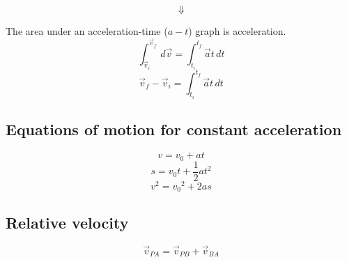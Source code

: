\documentclass[11pt]{article}
\begin{document}
\[\Downarrow\]

The area under an acceleration-time (\(a-t\)) graph is acceleration.
\[\int_{\vec{v}_i}^{\vec{v}_f} \, d \vec{v} = \int_{t_i}^{t_f} \vec{a} t \, dt\]
\[\vec{v}_f - \vec{v}_i = \int_{t_i}^{t_f} \vec{a} t \, dt\]
\subsection{Equations of motion for constant acceleration}
\label{sec:org6dbaeca}

\[v = v_0 + at \tag{1}\]
\[s = v_0t + \frac{1}{2} at^2 \tag{2}\]
\[v^2 = {v_0}^2 + 2as \tag{3}\]
\subsection{Relative velocity}
\label{sec:orge2ba04a}
\[\vec{v}_{PA} = \vec{v}_{PB} + \vec{v}_{BA}\]
\end{document}
